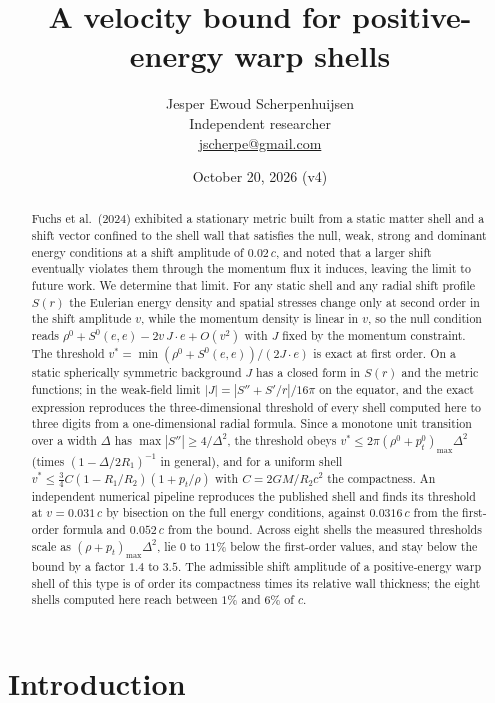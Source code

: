 \documentclass[11pt,a4paper]{article}
\title{A velocity bound for positive-energy warp shells}
\author{Jesper Ewoud Scherpenhuijsen\\ \small Independent researcher\\ \small \href{mailto:jscherpe@gmail.com}{jscherpe@gmail.com}}
\date{October 20, 2026 (v4)}
\theoremstyle{remark}
\begin{document}
\maketitle

\begin{abstract}
Fuchs et al.\ (2024) exhibited a stationary metric built from a static matter shell and a shift vector confined to the shell wall that satisfies the null, weak, strong and dominant energy conditions at a shift amplitude of $0.02\,c$, and noted that a larger shift eventually violates them through the momentum flux it induces, leaving the limit to future work. We determine that limit. For any static shell and any radial shift profile $S(r)$ the Eulerian energy density and spatial stresses change only at second order in the shift amplitude $v$, while the momentum density is linear in $v$, so the null condition reads $\rho^0 + S^0(e,e) - 2v\,J\cdot e + O(v^2)$ with $J$ fixed by the momentum constraint. The threshold $v^* = \min(\rho^0 + S^0(e,e))/(2J\cdot e)$ is exact at first order. On a static spherically symmetric background $J$ has a closed form in $S(r)$ and the metric functions; in the weak-field limit $|J| = |S'' + S'/r|/16\pi$ on the equator, and the exact expression reproduces the three-dimensional threshold of every shell computed here to three digits from a one-dimensional radial formula. Since a monotone unit transition over a width $\Delta$ has $\max|S''| \ge 4/\Delta^2$, the threshold obeys $v^* \le 2\pi(\rho^0+p_t^0)_{\max}\Delta^2$ (times $(1-\Delta/2R_1)^{-1}$ in general), and for a uniform shell $v^* \le \tfrac{3}{4}C(1-R_1/R_2)(1+p_t/\rho)$ with $C = 2GM/R_2c^2$ the compactness. An independent numerical pipeline reproduces the published shell and finds its threshold at $v = 0.031\,c$ by bisection on the full energy conditions, against $0.0316\,c$ from the first-order formula and $0.052\,c$ from the bound. Across eight shells the measured thresholds scale as $(\rho+p_t)_{\max}\Delta^2$, lie $0$ to $11\%$ below the first-order values, and stay below the bound by a factor $1.4$ to $3.5$. The admissible shift amplitude of a positive-energy warp shell of this type is of order its compactness times its relative wall thickness; the eight shells computed here reach between $1\%$ and $6\%$ of $c$.
\end{abstract}

\section{Introduction}
\end{document}
